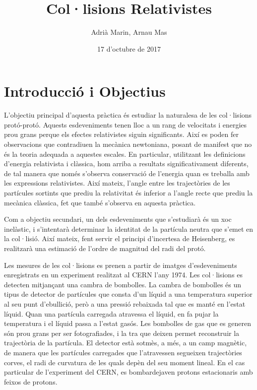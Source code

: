\documentclass[12pt]{article}
\title{Col·lisions Relativistes}
\author{Adrià Marin, Arnau Mas}
\date{17 d'octubre de 2017}
\begin{document}
\maketitle

\section{Introducció i Objectius}
L'objectiu principal d'aquesta pràctica és estudiar la naturalesa de les col·lisions protó-protó. Aquests esdeveniments tenen lloc a un rang de velocitats i energies prou grans perque els efectes relativistes siguin significants. Així es poden fer observacions que contradiuen la mecànica newtoniana, posant de manifest que no és la teoria adequada a aquestes escales. En particular, utilitzant les definicions d'energia relativista i clàssica, hom arriba a resultats significativament diferents, de tal manera que només s'observa conservació de l'energia quan es treballa amb les expressions relativistes. Així mateix, l'angle entre les trajectòries de les partícules sortints que prediu la relativitat és inferior a l'angle recte que prediu la mecànica clàssica, fet que també s'observa en aquesta pràctica.

Com a objectiu secundari, un dels esdeveniments que s'estudiarà és un xoc inelàstic, i s'intentarà determinar la identitat de la partícula neutra que s'emet en la col·lisió. Així mateix, fent servir el principi d'incertesa de Heisenberg, es realitzarà una estimació de l'ordre de magnitud del radi del protó.

Les mesures de les col·lisions es prenen a partir de imatges d'esdeveniments enregistrats en un experiment realitzat al CERN l'any 1974. Les col·lisions es detecten mitjançant una cambra de bombolles. La cambra de bombolles és un tipus de detector de partícules que consta d'un líquid a una temperatura superior al seu punt d'ebullició, però a una pressió rebaixada tal que es manté en l'estat líquid. Quan una partícula carregada atravessa el líquid, en fa pujar la temperatura i el líquid passa a l'estat gasós. Les bombolles de gas que es generen són prou grans per ser fotografiades, i la tra que deixen permet reconstruir la trajectòria de la partícula. El detector està sotmès, a més, a un camp magnètic, de manera que les partícules carregades que l'atravessen segueixen trajectòries corves, el radi de curvatura de les quals depèn del seu moment lineal. En el cas particular de l'experiment del CERN, es bombardejaven protons estacionaris amb feixos de protons.
   
\end{document}
